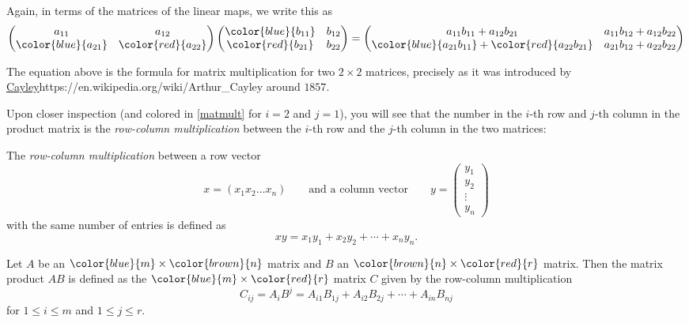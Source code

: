 \documentclass{article}
\begin{document}
Again, in terms of the matrices of the linear maps, we write this as
\begin{equation}\label{matmult}
\begin{pmatrix}
a_{11} & a_{12}\\
\color{blue}{a_{21}} & \color{red}{a_{22}}
\end{pmatrix}
\begin{pmatrix}
\color{blue}{b_{11}} & b_{12}\\
\color{red}{b_{21}} & b_{22}
\end{pmatrix}
=
\begin{pmatrix}
a_{11} b_{11} + a_{12} b_{21} & a_{11} b_{12} + a_{12} b_{22}\\
\color{blue}{a_{21} b_{11}} + \color{red}{a_{22} b_{21}} & a_{21} b_{12} + a_{22} b_{22}
\end{pmatrix}
\end{equation}

The equation above is the formula for matrix multiplication for two $2\times 2$ matrices, precisely as
it was introduced
by \url{Cayley}{https://en.wikipedia.org/wiki/Arthur_Cayley} around $1857$.


Upon closer inspection (and colored in \eqref{matmult} for $i=2$ and $j= 1$), you will see that
the number in the $i$-th row and $j$-th column in the product matrix is the
\emph{row-column multiplication} between the $i$-th row and
the $j$-th column in the two matrices:

\begin{frameit}
The \emph{row-column multiplication} between a row vector
$$
x = (x_1 x_2 \dots x_n)\qquad\text{and a column vector}\qquad
y = \begin{pmatrix}
y_1 \\ y_2 \\ \vdots \\ y_n
\end{pmatrix}
$$
with the same number of entries is defined as
$$
x y = x_1 y_1 + x_2 y_2 + \cdots + x_n y_n.
$$
\end{frameit}


\begin{definition}[emph]\label{defmatmult}
  Let $A$ be an  $\color{blue}{m}\times \color{brown}{n}$ matrix and $B$ an $\color{brown}{n}\times \color{red}{r}$ matrix.
  Then the matrix product $A B$ is defined as the $\color{blue}{m}\times\color{red}{r}$ matrix $C$ given by the
  row-column multiplication
$$
C_{ij} = A_i B^j = A_{i1} B_{1j} + A_{i2} B_{2j} + \cdots + A_{in} B_{nj}
$$
for $1\leq i \leq m$ and $1\leq j \leq r$.
\end{definition}
\end{document}
